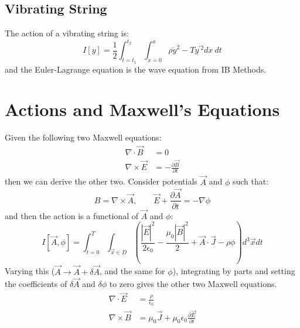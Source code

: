 \documentclass[../Main.tex]{subfiles}
\begin{document}
\subsection{Vibrating String}
The action of a vibrating string is:
\begin{equation*}
    I[y] = \frac12 \int_{t = t_1}^{t_2} \int_{x=0}^{a} \rho \dot{y}^2 - Ty^{\prime 2} dx~dt 
\end{equation*}
and the Euler-Lagrange equation is the wave equation from IB Methods.
\section{Actions and Maxwell's Equations}
Given the following two Maxwell equations:
\begin{align}
    \nabla \cdot \vec{B} &= 0 \label{eqnMBD} \\
    \nabla \times \vec{E} &= -\frac{\partial \vec{B}}{\partial t} \label{eqnMEC}
\end{align}
then we can derive the other two. Consider potentials $\vec{A}$ and $\phi$ such that:
\begin{equation*}
    B = \nabla \times \vec{A},\qquad \vec{E} + \frac{\partial \vec{A}}{\partial t} = -\nabla \phi
\end{equation*}
and then the action is a functional of $\vec{A}$ and $\phi$:
\begin{equation*}
    I[\vec{A}, \phi] = \int_{t = 0}^T\int_{\vec{x} \in D} \left(\frac{|\vec{E}|^2}{2\epsilon_0} - \frac{\mu_0|\vec{B}|^2}{2} + \vec{A} \cdot \vec{J} - \rho \phi\right) d^3\vec{x} dt
\end{equation*}
Varying this ($\vec{A} \to \vec{A} + \delta\vec{A}$, and the same for $\phi$), integrating by parts and setting the coefficients of $\delta\vec{A}$ and $\delta\phi$ to zero gives the other two Maxwell equations.
\begin{align}
    \nabla \cdot \vec{E} &= \frac{\rho}{\epsilon_0} \label{eqnMED} \\
    \nabla \times \vec{B} &= \mu_0 \vec{J} + \mu_0\epsilon_0 \frac{\partial \vec{E}}{\partial t} \label{eqnMBC}
\end{align}
\end{document}
